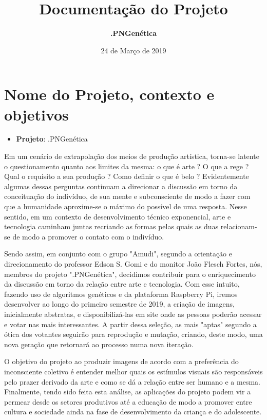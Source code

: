 \documentclass{article}
\title{\textbf{Documentação do Projeto}}
\author{\textbf{.PNGenética}}
\date{24 de Março de 2019}
\begin{document}
	
	\maketitle
	
	\section{Nome do Projeto, contexto e objetivos}
	\begin{itemize}
		\item {\textbf{Projeto}}: .PNGenética \newline
	\end{itemize}

	Em um cenário de extrapolação dos meios de produção artística, torna-se latente o questionamento quanto aos limites da mesma: o que é arte ? O que a rege ? Qual o requisito a sua produção ? Como definir o que é belo ? Evidentemente algumas dessas perguntas continuam a direcionar a discussão em torno da conceituação do indivíduo, de sua mente e subconsciente de modo a fazer com que a humanidade aproxime-se o máximo do possível de uma resposta. Nesse sentido, em um contexto de desenvolvimento técnico exponencial, arte e tecnologia caminham juntas recriando as formas pelas quais as duas relacionam-se de modo a promover o contato com o indivíduo. \newline

	Sendo assim, em conjunto com o grupo "Amudi", segundo a orientação e direcionamento do professor Edson S. Gomi e do monitor João Flesch Fortes, nós, membros do projeto ".PNGenética", decidimos contribuir para o enriquecimento da discussão em torno da relação entre arte e tecnologia. Com esse intuito, fazendo uso de algoritmos genéticos e da plataforma Raspberry Pi, iremos desenvolver ao longo do primeiro semestre de 2019, a criação de imagens, inicialmente abstratas, e disponibilizá-las em site onde as pessoas poderão acessar e votar nas mais interessantes. A partir dessa seleção, as mais "aptas" segundo a ótica dos votantes seguirão para reprodução e mutação, criando, deste modo, uma nova geração que retornará ao processo numa nova iteração.\newline

	O objetivo do projeto ao produzir imagens de acordo com a preferência do inconsciente coletivo é entender melhor quais os estímulos visuais são responsáveis pelo prazer derivado da arte e como se dá a relação entre ser humano e a mesma. Finalmente, tendo sido feita esta análise, as aplicações do projeto podem vir a permear desde os setores produtivos até a educação de modo a promover entre cultura e sociedade ainda na fase de desenvolvimento da criança e do adolescente. 
\end{document}
